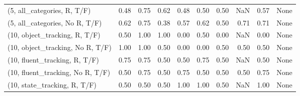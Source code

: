 \begin{table*}[h!]
\begin{adjustbox}{width=2\columnwidth,center}
\begin{tabular}{lrrr|rrr|rrr}
(5, all\_categories, R, T/F)          &                      0.48 &                  0.75 &                      0.62 &                          0.48 &                      0.50 &                          0.50 &                                    NaN &                               0.57 &                                  None \\
(5, all\_categories, No R, T/F)       &                      0.62 &                  0.75 &                      0.38 &                          0.57 &                      0.62 &                          0.50 &                                   0.71 &                               0.71 &                                  None \\



\midrule
(10, object\_tracking, R, T/F)         &                      0.50 &                  1.00 &                      1.00 &                          0.00 &                      0.50 &                          0.00 &                                    NaN &                               0.00 &                                  None \\
(10, object\_tracking, No R, T/F)      &                      1.00 &                  1.00 &                      0.50 &                          0.00 &                      0.00 &                          0.50 &                                   0.50 &                               0.50 &                                  None \\
(10, fluent\_tracking, R, T/F)         &                      0.75 &                  0.75 &                      0.50 &                          0.50 &                      0.75 &                          0.50 &                                    NaN &                               0.50 &                                  None \\
(10, fluent\_tracking, No R, T/F)      &                      0.50 &                  0.75 &                      0.50 &                          0.75 &                      0.50 &                          0.50 &                                   0.50 &                               0.75 &                                  None \\
(10, state\_tracking, R, T/F)          &                      0.50 &                  0.50 &                      0.50 &                          1.00 &                      1.00 &                          0.50 &                                    NaN &                               1.00 &                                  None \\

\end{tabular}
\end{adjustbox}
\end{table*}
